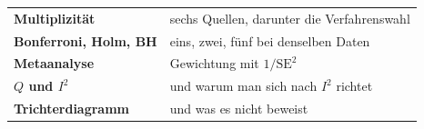 \begin{merksatz}
\begin{center}
\renewcommand{\arraystretch}{1.5}
\begin{tabular}{@{}P{3.2cm}P{5.4cm}@{}}
\toprule
\textbf{Multiplizität} & sechs Quellen, darunter die Verfahrenswahl\\
\textbf{Bonferroni, Holm, BH} & eins, zwei, fünf bei denselben Daten\\
\textbf{Metaanalyse} & Gewichtung mit $1/\mathrm{SE}^2$\\
\textbf{$Q$ und $I^2$} & und warum man sich nach $I^2$ richtet\\
\textbf{Trichterdiagramm} & und was es nicht beweist\\
\bottomrule
\end{tabular}
\end{center}

\begin{center}
\begin{minipage}{0.88\textwidth}
\end{minipage}
\end{center}
\end{merksatz}
